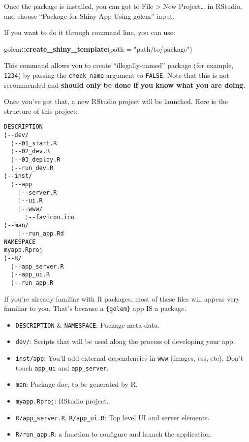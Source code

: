 \documentclass[]{book}
\newenvironment{Shaded}{\begin{snugshade}}{\end{snugshade}}
\newcommand{\DataTypeTok}[1]{\textcolor[rgb]{0.13,0.29,0.53}{#1}}
\newcommand{\KeywordTok}[1]{\textcolor[rgb]{0.13,0.29,0.53}{\textbf{#1}}}
\newcommand{\NormalTok}[1]{#1}
\newcommand{\OperatorTok}[1]{\textcolor[rgb]{0.81,0.36,0.00}{\textbf{#1}}}
\newcommand{\StringTok}[1]{\textcolor[rgb]{0.31,0.60,0.02}{#1}}
\begin{document}
Once the package is installed, you can got to File \textgreater{} New Project\ldots{} in RStudio, and choose ``Package for Shiny App Using golem'' input.

If you want to do it through command line, you can use:

\begin{Shaded}
\begin{Highlighting}[]
\NormalTok{golem}\OperatorTok{::}\KeywordTok{create_shiny_template}\NormalTok{(}\DataTypeTok{path =} \StringTok{"path/to/package"}\NormalTok{)}
\end{Highlighting}
\end{Shaded}

This command allows you to create ``illegally-named'' package (for example, \texttt{1234}) by passing the \texttt{check\_name} argument to \texttt{FALSE}. Note that this is not recommended and \textbf{should only be done if you know what you are doing}.

Once you've got that, a new RStudio project will be launched. Here is the structure of this project:

\begin{verbatim}
DESCRIPTION               
¦--dev/          
  ¦--01_start.R           
  ¦--02_dev.R           
  ¦--03_deploy.R           
  ¦--run_dev.R
¦--inst/ 
  ¦--app                
    ¦--server.R       
    ¦--ui.R           
    ¦--www/          
      ¦--favicon.ico
¦--man/ 
    ¦--run_app.Rd      
NAMESPACE
myapp.Rproj
¦--R/ 
  ¦--app_server.R       
  ¦--app_ui.R           
  ¦--run_app.R      
\end{verbatim}

If you're already familiar with R packages, most of these files will appear very familiar to you. That's because a \texttt{\{golem\}} app IS a package.

\begin{itemize}
\item
  \texttt{DESCRIPTION} \& \texttt{NAMESPACE}: Package meta-data.
\item
  \texttt{dev/}: Scripts that will be used along the process of developing your app.
\item
  \texttt{inst/app}: You'll add external dependencies in \texttt{www} (images, css, etc). Don't touch \texttt{app\_ui} and \texttt{app\_server}.
\item
  \texttt{man}: Package doc, to be generated by R.
\item
  \texttt{myapp.Rproj}: RStudio project.
\item
  \texttt{R/app\_server.R}, \texttt{R/app\_ui.R}: Top level UI and server elements.
\item
  \texttt{R/run\_app.R}: a function to configure and launch the application.
\end{itemize}
\end{document}
